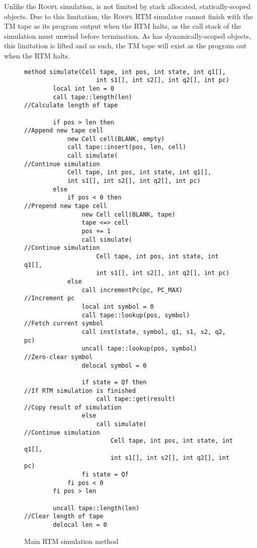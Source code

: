 Unlike the \textsc{Roopl} simulation, \rooplpp is not limited by stack allocated, statically-scoped objects. Due to this limitation, the \textsc{Roopl} RTM simulator cannot finish with the TM tape as its program output when the RTM halts, as the call stack of the simulation must unwind before termination. As \rooplpp has dynamically-scoped objects, this limitation is lifted and as such, the TM tape will exist as the program out when the RTM halts.

\begin{figure}[ht]
    \centering
    \begin{lstlisting}[style = basic, language = roopl]
    method simulate(Cell tape, int pos, int state, int q1[], 
                    int s1[], int s2[], int q2[], int pc)
        local int len = 0
        call tape::length(len)                                  //Calculate length of tape

        if pos > len then                                       //Append new tape cell
            new Cell cell(BLANK, empty)
            call tape::insert(pos, len, cell)
            call simulate(                                      //Continue simulation
            Cell tape, int pos, int state, int q1[], 
            int s1[], int s2[], int q2[], int pc) 
        else
            if pos < 0 then                                     //Prepend new tape cell
                new Cell cell(BLANK, tape)
                tape <=> cell
                pos += 1
                call simulate(                                  //Continue simulation
                    Cell tape, int pos, int state, int q1[], 
                    int s1[], int s2[], int q2[], int pc)         
            else
                call incrementPc(pc, PC_MAX)                    //Increment pc
                local int symbol = 0
                call tape::lookup(pos, symbol)                  //Fetch current symbol
                call inst(state, symbol, q1, s1, s2, q2, pc)
                uncall tape::lookup(pos, symbol)                //Zero-clear symbol    
                delocal symbol = 0
                             
                if state = Qf then                              //If RTM simulation is finished
                    call tape::get(result)                      //Copy result of simulation
                else
                    call simulate(                              //Continue simulation
                        Cell tape, int pos, int state, int q1[], 
                        int s1[], int s2[], int q2[], int pc)     
                fi state = Qf
            fi pos < 0
        fi pos > len

        uncall tape::length(len)                                //Clear length of tape
        delocal len = 0
    \end{lstlisting}
    \caption{Main RTM simulation method}
    \label{fig:rtm-simulation-method}
\end{figure} 

